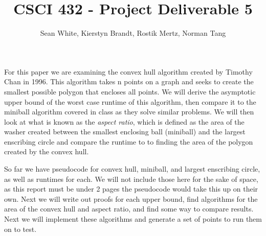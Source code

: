 \documentclass[12pt]{article}
\author{Sean White, Kierstyn Brandt, Rostik Mertz, Norman Tang}
\title{CSCI 432 - Project Deliverable 5}
\begin{document}
\maketitle

For this paper we are examining the convex hull algorithm created by Timothy Chan in 1996. This algorithm takes n points on a graph and seeks to create the smallest possible polygon that encloses all points. We will derive the asymptotic upper bound of the worst case runtime of this algorithm, then compare it to the miniball algorithm covered in class as they solve similar problems. We will then look at what is known as the \textit{aspect ratio}, which is defined as the area of the washer created between the smallest enclosing ball (miniball) and the largest enscribing circle and compare the runtime to to finding the area of the polygon created by the convex hull.

So far we have pseudocode for convex hull, miniball, and largest enscribing circle, as well as runtimes for each. We will not include those here for the sake of space, as this report must be under 2 pages the pseudocode would take this up on their own. Next we will write out proofs for each upper bound, find algorithms for the area of the convex hull and aspect ratio, and find some way to compare results. Next we will implement these algorithms and generate a set of points to run them on to test. 
\end{document}
